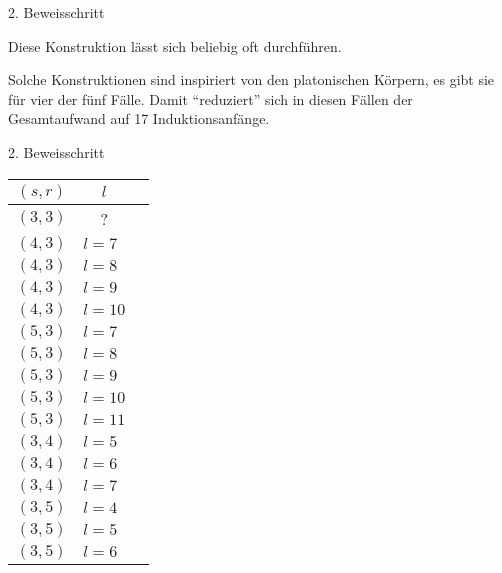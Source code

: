 \documentclass[10pt, notheorems]{beamer}
\begin{document}
\begin{frame}[fragile]{2. Beweisschritt}{}
\begin{example}
{
      \par }
    Diese Konstruktion lässt sich beliebig oft durchführen.
  \end{example}
  \pause
  Solche Konstruktionen sind inspiriert von den platonischen Körpern, es gibt sie für vier der fünf Fälle. Damit ``reduziert'' sich in diesen Fällen der Gesamtaufwand auf 17 Induktionsanfänge.
\end{frame}

\begin{frame}{2. Beweisschritt}
  \begin{tabularx}{\textwidth}{|c|l|X|}
    \hline
    $(s, r)$ & \multicolumn{1}{c|}{$l$} &\\
    \hline
    $(3, 3)$ & \multicolumn{1}{c|}{?} & \\
    $(4, 3)$ & $l = 7$ &\\
    $(4, 3)$ & $l = 8$ &\\
    $(4, 3)$ & $l = 9$ &\\
    $(4, 3)$ & $l = 10$ &\\
    $(5, 3)$ & $l = 7$ &\\
    $(5, 3)$ & $l = 8$ &\\
    $(5, 3)$ & $l = 9$ &\\
    $(5, 3)$ & $l = 10$ &\\
    $(5, 3)$ & $l = 11$ &\\
    $(3, 4)$ & $l = 5$ &\\
    $(3, 4)$ & $l = 6$ &\\
    $(3, 4)$ & $l = 7$ &\\
    $(3, 5)$ & $l = 4$ &\\
    $(3, 5)$ & $l = 5$ &\\
    $(3, 5)$ & $l = 6$ &\\
    \hline
  \end{tabularx}
\end{frame}
\end{document}
